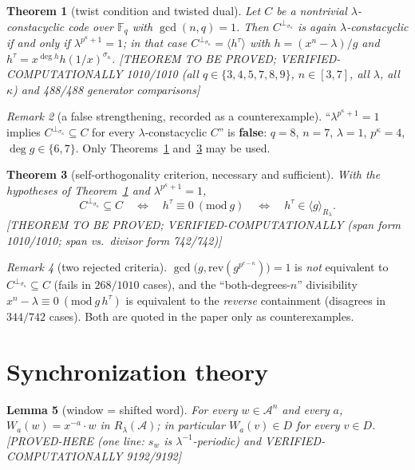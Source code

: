 \documentclass[11pt]{article}
\newtheorem{theorem}{Theorem}[section]
\newtheorem{lemma}[theorem]{Lemma}
\theoremstyle{definition}
\theoremstyle{remark}
\newtheorem{remark}[theorem]{Remark}
\theoremstyle{plain}
\newcommand{\Fq}{\mathbb{F}_q}
\newcommand{\Aalg}{\mathcal{A}}
\newcommand{\Rlam}{R_{\lambda}}
\newcommand{\perpsig}{^{\perp_{\sigma_\kappa}}}
\newcommand{\Sig}{\sigma_\kappa}
\newcommand{\status}[1]{\textnormal{\footnotesize[#1]}}
\begin{document}
\begin{theorem}[twist condition and twisted dual]\label{thm:twist}
Let $C$ be a nontrivial $\lambda$-constacyclic code over $\Fq$ with $\gcd(n,q)=1$. Then
$C\perpsig$ is again $\lambda$-constacyclic \emph{if and only if} $\lambda^{p^\kappa+1}=1$; in
that case $C\perpsig=\langle h^\tau\rangle$ with $h=(x^n-\lambda)/g$ and
$h^\tau=x^{\deg h}h(1/x)^{\Sig}$.
\status{THEOREM TO BE PROVED; VERIFIED-COMPUTATIONALLY 1010/1010 (all $q\in\{3,4,5,7,8,9\}$,
$n\in[3,7]$, all $\lambda$, all $\kappa$) and 488/488 generator comparisons}
\end{theorem}

\begin{remark}[a false strengthening, recorded as a counterexample]\label{rem:false}
``$\lambda^{p^\kappa+1}=1$ implies $C\perpsig\subseteq C$ for every $\lambda$-constacyclic
$C$'' is \textbf{false}: $q=8$, $n=7$, $\lambda=1$, $p^\kappa=4$, $\deg g\in\{6,7\}$. Only
Theorems~\ref{thm:twist} and~\ref{thm:contain} may be used.
\end{remark}

\begin{theorem}[self-orthogonality criterion, necessary and sufficient]\label{thm:contain}
With the hypotheses of Theorem~\ref{thm:twist} and $\lambda^{p^\kappa+1}=1$,
\[
C\perpsig\subseteq C
\quad\Longleftrightarrow\quad
h^\tau\equiv0\ (\mathrm{mod}\ g)
\quad\Longleftrightarrow\quad
h^\tau\in\langle g\rangle_{\Rlam}.
\]
\status{THEOREM TO BE PROVED; VERIFIED-COMPUTATIONALLY (span form 1010/1010; span vs.\ divisor
form 742/742)}
\end{theorem}

\begin{remark}[two rejected criteria]\label{rem:rejected}
$\gcd\big(g,\mathrm{rev}(g^{p^{e-\kappa}})\big)=1$ is \emph{not} equivalent to
$C\perpsig\subseteq C$ (fails in $268/1010$ cases), and the ``both-degrees-$n$'' divisibility
$x^n-\lambda\equiv0\ (\mathrm{mod}\ g\,h^\tau)$ is equivalent to the \emph{reverse} containment
(disagrees in $344/742$ cases). Both are quoted in the paper only as counterexamples.
\end{remark}

\section{Synchronization theory}\label{sec:sync}

\begin{lemma}[window = shifted word]\label{lem:window}
For every $w\in\Aalg^n$ and every $a$, $W_a(w)=x^{-a}\cdot w$ in $\Rlam(\Aalg)$; in particular
$W_a(v)\in D$ for every $v\in D$.
\status{PROVED-HERE (one line: $s_w$ is $\lambda^{-1}$-periodic) and
VERIFIED-COMPUTATIONALLY 9192/9192}
\end{lemma}
\end{document}
